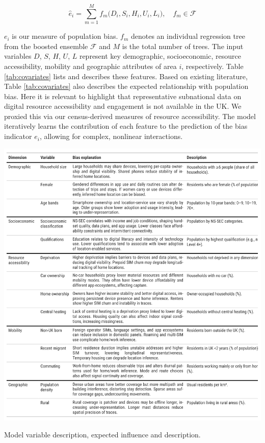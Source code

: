 \documentclass[]{rsos}%
\begin{document}
\begin{equation} \label{eq:xgb-model}
\widehat{e}_i 
= \sum_{m=1}^M f_m\bigl(D_i, S_i, H_i, U_i, L_i\bigr),
\quad f_m \in \mathcal{F}
\end{equation}

\(e_i\) is our measure of population bias. \(f_m\) denotes an individual
regression tree from the boosted ensemble \(\mathcal{F}\) and \(M\) is the
total number of trees. The input variables \(D\), \(S\), \(H\), \(U\), \(L\)
represent key demographic, socioeconomic, resource accessibility, mobility and geographic attributes of area \(i\), respectively. Table
\ref{tab:covariates} lists and describes these features. Based on existing literature, Table
\ref{tab:covariates} also describes the expected relationship with population bias. Here it is relevant to highlight that representative subnational data on digital resource accessibility and engagement is not available in the UK. We proxied this via our census-derived measures of resource accessibility. The model iteratively
learns the contribution of each feature to the prediction of the bias
indicator \(e_i\), allowing for complex, nonlinear interactions.

\begin{table}[h]
\centering
\includegraphics[width=1\linewidth]{figures/01_table-variable-dictionary_explain.png}
\caption{Model variable description, expected influence and description.}
\label{tab:covariates}
\end{table}
\end{document}
